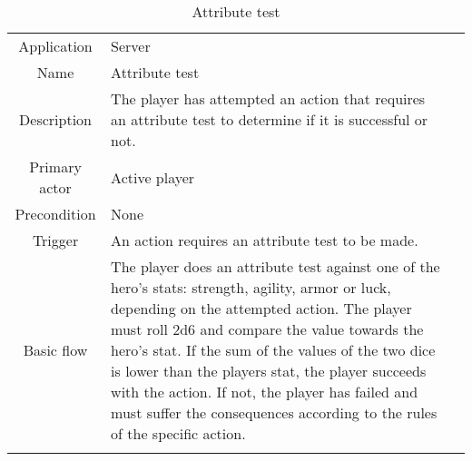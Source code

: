 \documentclass[a4paper,10pt]{report}
\begin{document}
\begin{table}
\caption{Attribute test}
\label{attributetest}
\begin{tabular}{|c| p{9cm}|c}
\hline
Application & Server & \\
Name & Attribute test & \\
Description & The player has attempted an action that requires an attribute test to determine if it is successful or not. & \\
Primary actor & Active player & \\
Precondition & None & \\
Trigger & An action requires an attribute test to be made. & \\ \hline
Basic flow & The player does an attribute test against one of the hero's stats: strength, agility, armor or luck, depending on the attempted action. The player must roll 2d6 and compare the value towards the hero's stat. If the sum of the values of the two dice is lower than the players stat, the player succeeds with the action. If not, the player has failed and must suffer the consequences according to the rules of the specific action. & \\ \hline
 \\
\hline
\end{tabular}
\end{table}
\end{document}
